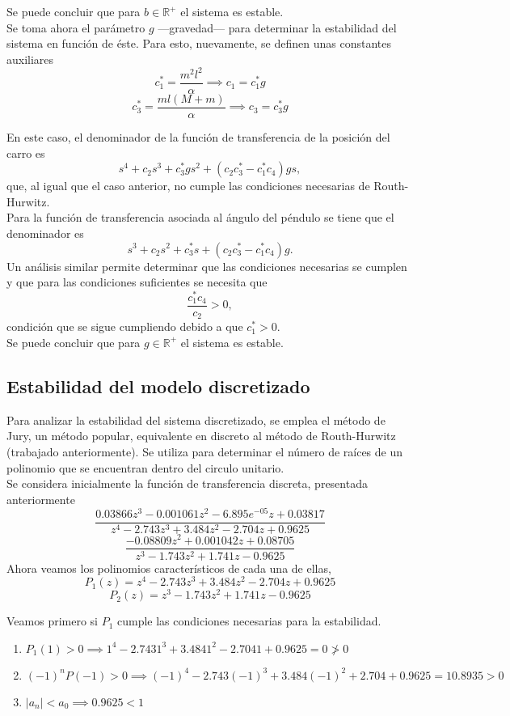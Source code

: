 Se puede concluir que para $b \in \mathbb{R}^+$ el sistema es estable.\\


Se toma ahora el parámetro $g$ ---gravedad--- para determinar la estabilidad del sistema en función de éste. Para esto, nuevamente, se definen unas constantes auxiliares
\[ c_1^* = \frac{m^2 l^2}{\alpha} \implies c_1 = c_1^* g \]
\[ c_3^* = \frac{m l (M + m)}{\alpha} \implies c_3 = c_3^* g \]

En este caso, el denominador de la función de transferencia de la posición del carro es
\[ s^4 + c_2 s^3 + c_3^* g s^2 + (c_2 c_3^* - c_1^* c_4) g s, \] que, al igual que el caso
anterior, no cumple las condiciones necesarias de Routh-Hurwitz.\\

Para la función de transferencia asociada al ángulo del péndulo se tiene que el
denominador es \[ s^3 + c_2 s^2 + c_3^* s + (c_2 c_3^* - c_1^* c_4) g. \]
Un análisis similar permite determinar que las condiciones necesarias se
cumplen y que para las condiciones suficientes se necesita que
\[ \frac{c_1^* c_4}{c_2} > 0, \] condición que se sigue cumpliendo debido a que $c_1^* > 0$.\\

Se puede concluir que para $g \in \mathbb{R}^+$ el sistema es estable.

\subsection{Estabilidad del modelo discretizado}
Para analizar la estabilidad del sistema discretizado, se emplea el método de Jury, un método popular, equivalente en discreto al método de Routh-Hurwitz (trabajado anteriormente). Se utiliza para determinar
el número de raíces de un polinomio que se encuentran dentro del circulo unitario.\\


Se considera inicialmente la función de transferencia discreta, presentada anteriormente
\[
\dfrac{0.03866 z^3 - 0.001061 z^2 - 6.895e^{-05} z + 0.03817}{z^4 - 2.743 z^3 + 3.484 z^2 - 2.704 z + 0.9625}\]
\[
\dfrac{-0.08809 z^2 + 0.001042 z + 0.08705}{z^3 - 1.743 z^2 + 1.741 z - 0.9625}
\]
Ahora veamos los polinomios característicos de cada una de ellas,
\[
P_1(z) = {z^4 - 2.743 z^3 + 3.484 z^2 - 2.704 z + 0.9625}\]
\[
P_2(z) = {z^3 - 1.743 z^2 + 1.741 z - 0.9625}
\]

Veamos primero si $P_1$ cumple las condiciones necesarias para la estabilidad.
\begin{enumerate}
\item $P_1(1) > 0 \implies 1^4 - 2.743 1^3 + 3.484 1^2 - 2.704 1 + 0.9625 = 0 \ngtr 0$
\item $(-1)^nP(-1)>0 \implies (-1)^4 - 2.743 (-1)^3 + 3.484 (-1)^2 + 2.704 + 0.9625 = 10.8935 > 0$
\item $|a_n| < a_0 \implies 0.9625 < 1$ 
\end{enumerate}
\textbf{}

